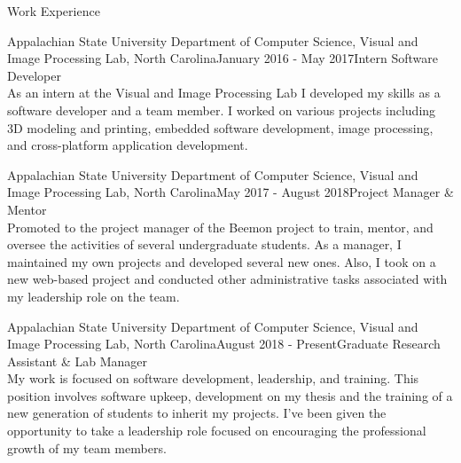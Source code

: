 \documentclass{resume} %
\begin{document}

\begin{rSection}{Work Experience}

\begin{rSubsection}{Appalachian State University Department of Computer Science, Visual and Image Processing Lab, North Carolina}{January 2016 - May 2017}{Intern Software Developer}{}
\\ As an intern at the Visual and Image Processing Lab I developed my skills as a software developer and a team member.  I worked on various projects including 3D modeling and printing, embedded software development, image processing, and cross-platform application development.  
\end{rSubsection}

\begin{rSubsection}{Appalachian State University Department of Computer Science, Visual and Image Processing Lab, North Carolina}{May 2017 - August 2018}{Project Manager \& Mentor}{}
\\ Promoted to the project manager of the Beemon project to train, mentor, and oversee the activities of several undergraduate students.  As a manager, I maintained my own projects and developed several new ones. Also, I took on a new web-based project and conducted other administrative tasks associated with my leadership role on the team.  
\end{rSubsection}

\begin{rSubsection}{Appalachian State University Department of Computer Science, Visual and Image Processing Lab, North Carolina}{August 2018 - Present}{Graduate Research Assistant \& Lab Manager}{}
\\ My work is focused on software development, leadership, and training.  This position involves software upkeep, development on my thesis and the training of a new generation of students to inherit my projects. I’ve been given the opportunity to take a leadership role focused on encouraging the professional growth of my team members.
\end{rSubsection}

\end{rSection}

\end{document}
